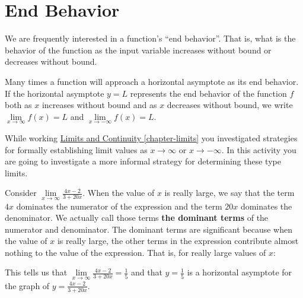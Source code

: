 \documentclass[10pt,oneside,]{book}
\newcommand{\terminology}[1]{\textbf{#1}}
\theoremstyle{plain}
\theoremstyle{definition}
\numberwithin{equation}{section}
\newcounter{figstack}
\newcounter{figindex}
\newlength\fight
\newcommand\pushValignCaptionBottom[5][b]{%
\stepcounter{figstack}%
\expandafter\def\csname %
figalign\romannumeral\value{figstack}\endcsname{#1}%
\expandafter\def\csname %
figtype\romannumeral\value{figstack}\endcsname{#2}%
\expandafter\def\csname %
figwd\romannumeral\value{figstack}\endcsname{#3}%
\expandafter\def\csname %
figcontent\romannumeral\value{figstack}\endcsname{#4}%
\expandafter\def\csname %
figcap\romannumeral\value{figstack}\endcsname{#5}%
\setbox0=\hbox{%
\begin{#2}{#3}#4\end{#2}}%
\ifdim\dimexpr\ht0+\dp0\relax>\fight\global\setlength{\fight}{%
\dimexpr\ht0+\dp0\relax}\fi%
}
\newcommand\popValignCaptionBottom{%
\setcounter{figindex}{0}%
\hfill%
\whiledo{\value{figindex}<\value{figstack}}{%
\stepcounter{figindex}%
\def\tmp{\csname figwd\romannumeral\value{figindex}\endcsname}%
\begin{\csname figtype\romannumeral\value{figindex}\endcsname}[t]{\tmp}%
\centering%
\stackinset{c}{}%
{\csname figalign\romannumeral\value{figindex}\endcsname}{}%
{\csname figcontent\romannumeral\value{figindex}\endcsname}%
{\rule{0pt}{\fight}}\par%
\csname figcap\romannumeral\value{figindex}\endcsname%
\end{\csname figtype\romannumeral\value{figindex}\endcsname}%
\hfill%
}%
\setcounter{figstack}{0}%
\setlength{\fight}{0pt}%
\hfill%
}
\newcommand{\fe}[2]{#1\mathopen{}\left(#2\right)\mathclose{}}
\begin{document}
\section[End Behavior]{End Behavior}\label{section-end-behavior}
We are frequently interested in a function's ``end behavior''.  That is, what is the behavior of the function as the input variable increases without bound or decreases without bound.%
\par
Many times a function will approach a horizontal asymptote as its end behavior.  If the horizontal asymptote \(y=L\) represents the end behavior of the function \(f\) both as \(x\) increases without bound and as \(x\) decreases without bound, we write \(\lim\limits_{x\to\infty}\fe{f}{x}=L\) and \(\lim\limits_{x\to-\infty}\fe{f}{x}=L\).%
\par
While working \hyperref[chapter-limits]{Limits and Continuity \ref{chapter-limits}} you investigated strategies for formally establishing limit values as \(x\to\infty\) or \(x\to-\infty\).  In this activity you are going to investigate a more informal strategy for determining these type limits.%
\par
Consider \(\lim\limits_{x\to\infty}\frac{4x-2}{3+20x}\). When the value of \(x\) is really large, we say that the term \(4x\) dominates the numerator of the expression and the term \(20x\) dominates the denominator. We actually call those terms \terminology{the dominant terms} of the numerator and denominator.  The dominant terms are significant because when the value of \(x\) is really large, the other terms in the expression contribute almost nothing to the value of the expression.   That is, for really large values of \(x\):%
\par
This tells us that \(\lim\limits_{x\to\infty}\frac{4x-2}{3+20x}=\frac{1}{5}\) and that \(y=\frac{1}{5}\) is a horizontal asymptote for the graph of \(y=\frac{4x-2}{3+20x}\).%
\typeout{************************************************}
\typeout{************************************************}
\end{document}
